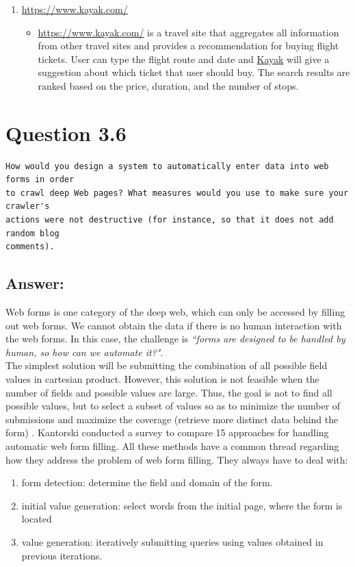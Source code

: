 \documentclass[letterpaper,11pt]{article}
\begin{document}
\begin{enumerate}
\begin{itemize}
		\end{itemize}
	\item \url{https://www.kayak.com/}
		\begin{itemize}
			\item \url{https://www.kayak.com/} is a travel site that aggregates all information from other travel sites and provides a recommendation for buying flight tickets. User can type the flight route and date and \href{https://www.kayak.com/}{Kayak} will give a suggestion about which ticket that user should buy. The search results are ranked based on the price, duration, and the number of stops. 
		\end{itemize}
\end{enumerate}
\noindent\makebox[\linewidth]{\rule{\textwidth}{0.4pt}}

\section*{Question 3.6}
\begin{verbatim}
How would you design a system to automatically enter data into web forms in order
to crawl deep Web pages? What measures would you use to make sure your crawler's
actions were not destructive (for instance, so that it does not add random blog
comments). 
\end{verbatim}

\subsection*{Answer:}
Web forms is one category of the deep web, which can only be accessed by filling out web forms. We cannot obtain the data if there is no human interaction with the web forms. In this case, the challenge is \textit{``forms are designed to be handled by human, so how can we automate it?"}.\\
The simplest solution will be submitting the combination of all possible field values in cartesian product. However, this solution is not feasible when the number of fields and possible values are large. Thus, the goal is not to find all possible values, but to select a subset of values so as to minimize the number of submissions and maximize the coverage (retrieve more distinct data behind the form) \cite{kantorski2012automatic}. 
Kantorski \cite{Kantorski:2015:AFH:2783888.2783898} conducted a survey to compare 15 approaches for handling automatic web form filling. All these methods have a common thread regarding how they address the problem of web form filling. They always have to deal with: 
\begin{enumerate}
	\item form detection: determine the field and domain of the form.
	\item initial value generation:  select words from the initial page, where the form is located
	\item value generation: iteratively submitting queries using values obtained in previous iterations. 
\end{enumerate}
\end{document}
